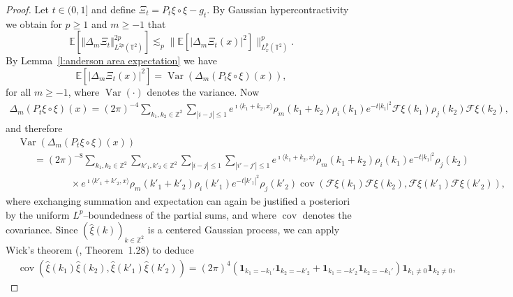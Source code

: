 \documentclass[11pt,a4paper]{article}
\newcommand{\tmop}[1]{\ensuremath{\operatorname{#1}}}
\theoremstyle{remark}
\newcommand{\E}{\mathbb{E}}
\newcommand{\CF}{\ensuremath{\mathscr{F}}}
\begin{document}
\begin{proof}
   Let $t \in (0,1]$ and define $\Xi_t = P_t \xi \circ \xi - g_t$. By Gaussian hypercontractivity we obtain for $p\geqslant 1$ and $m \geqslant - 1$ that
   \begin{equation}\label{e:anderson area hyper}
      \E [\Vert  \Delta_m \Xi_t \Vert_{L^{2 p} ( \mathbb{T}^2 )}^{2 p}] \lesssim_p \lVert \E[|\Delta_m \Xi_t ( x ) |^2] \rVert ^p_{L^p_x(\mathbb{T}^2)}.
   \end{equation}
   By Lemma~\ref{l:anderson area expectation} we have
   \begin{equation}\label{e:anderson area m-block}
      \E[| \Delta_m \Xi_t(x)|^2] = \tmop{Var} ( \Delta_m ( P_t \xi\circ \xi ) ( x ) ),
   \end{equation}
   for all $m \ge -1$, where $\tmop{Var}(\cdot)$ denotes the variance.
   Now
   \begin{gather*}
      \Delta_m ( P_t \xi\circ \xi ) (x) = ( 2 \pi )^{- 4} \sum_{k_1, k_2 \in \mathbb{Z}^2}\sum_{| i - j | \leqslant 1} e^{\imath \langle k_1 + k_2, x \rangle} \rho_m ( k_1 + k_2 ) \rho_i ( k_1 )     e^{- t | k_1 |^2} \CF{\xi} ( k_1 ) \rho_j (k_2) \CF{\xi} ( k_2 ),
   \end{gather*}
   and therefore
   \begin{align*}
      &\tmop{Var} ( \Delta_m ( P_t \xi\circ \xi ) ( x ) )\\
      &\hspace{20pt} = ( 2 \pi )^{- 8} \sum_{k_1, k_2 \in \mathbb{Z}^2} \sum_{k'_1, k'_2 \in \mathbb{Z}^2} \sum_{| i - j | \leqslant 1} \sum_{| i' - j' | \leqslant 1} e^{\imath \langle k_1 + k_2, x \rangle} \rho_m ( k_1 + k_2 ) \rho_i ( k_1) e^{- t | k_1 |^2} \rho_j ( k_2 )\\
      &\hspace{65pt} \times e^{\imath \langle k'_1 + k'_2, x \rangle} \rho_m (k'_1 + k'_2 ) \rho_i ( k'_1 ) e^{- t | k'_1 |^2}\rho_j ( k'_2 ) \tmop{cov}(\CF{\xi} ( k_1 )\CF{\xi} ( k_2 ), \CF{\xi} ( k'_1 ) \CF{\xi}( k'_2 ) ),
   \end{align*}
   where exchanging summation and expectation can again be justified a posteriori by the uniform $L^p$--boundedness of the partial sums, and where $\tmop{cov}$ denotes the covariance. Since $( \widehat{\xi} (k) )_{k \in \mathbb{Z}^2}$ is a centered Gaussian process, we can apply Wick's theorem (\cite{Janson1997}, Theorem~1.28) to deduce
   \begin{align*}
      &\tmop{cov} ( \widehat{\xi} ( k_1 ) \widehat{\xi} (k_2), \widehat{\xi} ( k'_1 ) \widehat{\xi} (k'_2)) = ( 2 \pi )^4 ( \mathbf{1}_{k_1=-k_1'} \mathbf{1}_{k_2 = - k'_2} + \mathbf{1}_{k_1 = - k'_2} \mathbf{1}_{k_2 = - k_1'} ) \mathbf{1}_{k_1 \neq 0} \mathbf{1}_{k_2 \neq 0},

\end{align*}
\end{proof}
\end{document}
